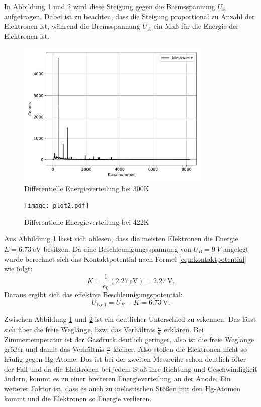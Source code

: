 In Abbildung \ref{fig:plot1} und \ref{fig:plot2} wird
diese Steigung gegen die Bremsspannung $U_A$ aufgetragen. Dabei ist zu beachten, dass
die Steigung proportional zu Anzahl der Elektronen ist, während die Bremsspannung $U_A$
ein Maß für die Energie der Elektronen ist.



\begin{figure}[H]
  \centering
  \includegraphics[height=7cm]{plot1.pdf}
  \caption{Differentielle Energieverteilung bei 300\;K }
  \label{fig:plot1}
\end{figure}

 \begin{figure}[H]
   \centering
   \texttt{[image: plot2.pdf]}
   \caption{Differentielle Energieverteilung bei 422\;K}
   \label{fig:plot2}
 \end{figure}



Aus Abbildung \ref{fig:plot1} lässt sich ablesen, dass die meisten Elektronen
die Energie $E=\SI{6,73}{\eV}$ besitzen.
Da eine Beschleunigungsspannung von $U_B=\SI{9}{V}$ angelegt wurde berechnet sich das
Kontaktpotential nach Formel \ref{eqn:kontaktpotential} wie folgt:
\begin{equation}
  K=\frac{1}{e_0}(\SI{2,27}{\eV})=\SI{2,27}{\V}.
  \label{kontakt}
\end{equation}
Daraus ergibt sich das effektive Beschleunigungspotential:
\begin{equation}
  U_{\text{B,eff}}= U_B -K =\SI{6,73}{\V}.
\end{equation}

Zwischen Abbildung \ref{fig:plot1} und \ref{fig:plot2} ist ein deutlicher
Unterschied zu erkennen. Das lässt sich über die freie Weglänge, bzw. das Verhältnis
$\frac{a}{\bar{w}}$ erklären. Bei Zimmertemperatur ist der Gasdruck deutlich geringer,
also ist die freie Weglänge größer und damit das Verhältnis $\frac{a}{\bar{w}}$
kleiner. Also stoßen die Elektronen nicht so häufig gegen Hg-Atome. Das ist bei der zweiten
Messreihe schon deutlich öfter der Fall und da die Elektronen bei jedem Stoß ihre
Richtung und Geschwindigkeit ändern, kommt es zu einer breiteren Energieverteilung
an der Anode. Ein weiterer Faktor ist, dass es auch zu inelastischen Stößen mit den
Hg-Atomen kommt und die Elektronen so Energie verlieren.

